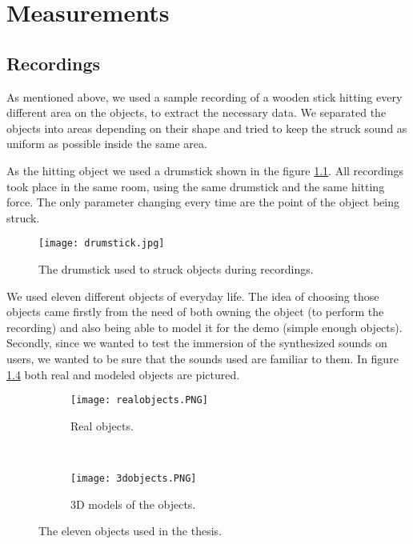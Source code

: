\chapter{Measurements}\label{ch:measurements}

\section{Recordings}

As mentioned above, we used a sample recording of a wooden stick hitting every different area on the objects, to extract the necessary data. We separated the objects into areas depending on their shape and tried to keep the struck sound as uniform as possible inside the same area. 

As the hitting object we used a drumstick shown in the figure \ref{fig:drumstick}. All recordings took place in the same room, using the same drumstick and the same hitting force. The only parameter changing every time are the point of the object being struck.

\begin{figure}[H]
  \centering
    \texttt{[image: drumstick.jpg]}
      \caption{The drumstick used to struck objects during recordings.}
      \label{fig:drumstick}
\end{figure}

We used eleven different objects of everyday life. The idea of choosing those objects came firstly from the need of both owning the object (to perform the recording) and also being able to model it for the demo (simple enough objects). Secondly, since we wanted to test the immersion of the synthesized sounds on users, we wanted to be sure that the sounds used are familiar to them. In figure \ref{fig:objects} both real and modeled objects are pictured. 

\begin{figure}[H]
    \centering
    \begin{subfigure}[b]{0.7\textwidth}
        \texttt{[image: realobjects.PNG]}
        \caption{Real objects.}
        \label{fig:gull}
    \end{subfigure}
    ~ %
    \begin{subfigure}[b]{0.7\textwidth}
        \texttt{[image: 3dobjects.PNG]}
        \caption{3D models of the objects.}
        \label{fig:tiger}
    \end{subfigure}
    \caption{The eleven objects used in the thesis.}\label{fig:objects}
\end{figure}

